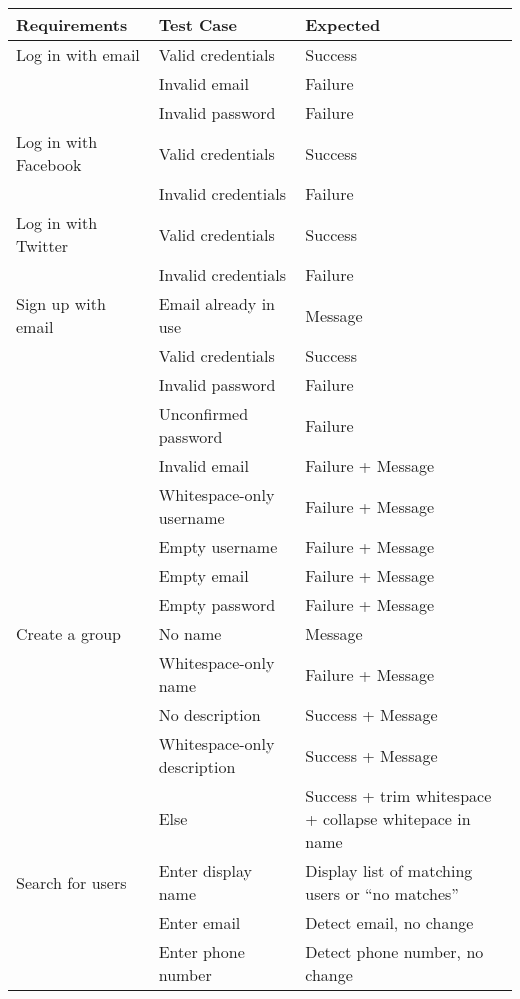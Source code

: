 \begin{tabularx}{\linewidth}{|X|X|X|}
\hline
\textbf{Requirements} & \textbf{Test Case} & \textbf{Expected} \\

\hline
Log in with email & Valid credentials & Success \\
                  & Invalid email & Failure \\
                  & Invalid password & Failure \\
\hline
Log in with Facebook & Valid credentials & Success \\
                     & Invalid credentials & Failure \\
\hline
Log in with Twitter & Valid credentials & Success \\
                    & Invalid credentials & Failure \\
\hline
Sign up with email & Email already in use & Message \\
                   & Valid credentials & Success \\
                   & Invalid password & Failure \\
                   & Unconfirmed password & Failure \\
                   & Invalid email & Failure + Message \\
                   & Whitespace-only username & Failure + Message \\
                   & Empty username & Failure + Message \\
                   & Empty email & Failure + Message \\
                   & Empty password & Failure + Message \\
\hline
Create a group & No name & Message \\
               & Whitespace-only name & Failure + Message \\
               & No description & Success + Message \\
               & Whitespace-only description & Success + Message \\
               & Else & Success + trim whitespace + collapse whitepace in name \\
\hline
Search for users & Enter display name & Display list of matching users or ``no matches'' \\
                 & Enter email & Detect email, no change \\
                 & Enter phone number & Detect phone number, no change \\

\end{tabularx}
